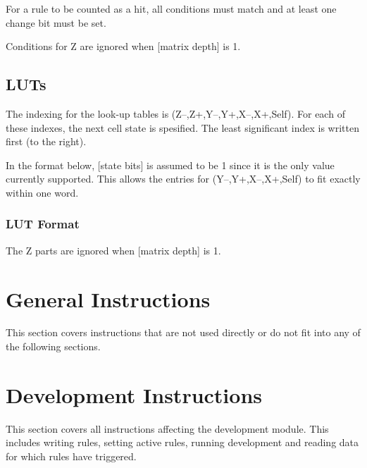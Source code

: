 \documentclass[a4paper]{article}
\begin{document}
For a rule to be counted as a hit, all conditions must match and at least one change bit must be set.

Conditions for Z are ignored when [matrix depth] is 1.

\newpage
\subsection{LUTs}

The indexing for the look-up tables is (Z–,Z+,Y–,Y+,X–,X+,Self).
For each of these indexes, the next cell state is spesified.
The least significant index is written first (to the right).

In the format below, [state bits] is assumed to be 1 since it is the only value currently supported.
This allows the entries for (Y–,Y+,X–,X+,Self) to fit exactly within one word.

\subsubsection*{LUT Format}


\notes

The Z parts are ignored when [matrix depth] is 1.

\section{General Instructions}

This section covers instructions that are not used directly or do not fit into any of the following sections.









\section{Development Instructions}

This section covers all instructions affecting the development module.
This includes writing rules, setting active rules, running development and reading data for which rules have triggered.
\end{document}
